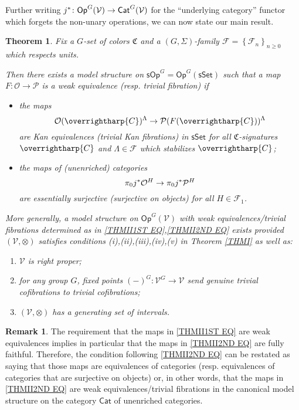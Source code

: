 \documentclass[a4paper,10pt
,draft
]{article}%
\numberwithin{equation}{section}
\numberwithin{figure}{section}
\newtheorem{theorem}[equation]{Theorem}%
\theoremstyle{definition} %
\newtheorem{remark}[equation]{Remark}%
\newcommand{\set}[1]{\left\{#1\right\}}%
\newcommand{\vect}[1]{\text{\overrightharp{\ensuremath{#1}}}}
\newcommand{\Op}{\mathsf{Op}}%
\newcommand{\F}{\ensuremath{\mathcal F}}
\newcommand{\V}{\ensuremath{\mathcal V}}
\renewcommand{\O}{\ensuremath{\mathcal O}}
\newcommand{\1}{\ensuremath{\mathbbm 1}}%
\begin{document}
Further writing 
$j^{\**} \colon 
\mathsf{Op}^G(\V) \to \mathsf{Cat}^G(\V)$
for the ``underlying category''
functor which forgets the non-unary operations, 
we can now state our main result.



\begin{theorem}\label{THMII}
Fix a $G$-set of colors $\mathfrak{C}$
and a $(G,\Sigma)$-family $\F = \set{\F_n}_{n \geq 0}$
which respects units.

Then there exists a model structure on
$\mathsf{sOp}^G = 
\mathsf{Op}^G(\mathsf{sSet})$
such that a map
$F\colon \mathcal{O} \to \mathcal{P}$
is a weak equivalence (resp. trivial fibration) if
\begin{itemize}
\item the maps
\begin{equation}\label{THMII1ST EQ}
	\O(\vect{C})^{\Lambda} \to \mathcal{P}(F(\vect{C}))^{\Lambda}
\end{equation}
are Kan equivalences (trivial Kan fibrations)
in $\mathsf{sSet}$
for all $\mathfrak{C}$-signatures $\vect{C}$
and $\Lambda \in \F$ which stabilizes $\vect{C}$;
\item 
the maps of (unenriched) categories
\begin{equation}\label{THMII2ND EQ}
\pi_0 j^{\**} \O^H 
\to 
\pi_0 j^{\**} \mathcal{P}^H 
\end{equation}
are essentially surjective (surjective on objects)
for all $H \in \F_1$.
\end{itemize}
More generally, a model structure on 
$\Op^G(\V)$
with weak equivalences/trivial fibrations determined as in 
\eqref{THMII1ST EQ},\eqref{THMII2ND EQ}
exists provided $(\V,\otimes)$ satisfies conditions
(i),(ii),(iii),(iv),(v) in Theorem \ref{THMI}
as well as:
\begin{enumerate}
	\item[(vi)] $\V$ is right proper;
	\item[(vii)]
	for any group $G$, fixed points
	$(-)^{G} \colon \V^G \to \V$
	send genuine trivial cofibrations to trivial cofibrations;
	\item[(viii)] $(\V, \otimes)$ has a generating set of intervals.
\end{enumerate}
\end{theorem}





\begin{remark}\label{WETRFCAN REM}
The requirement that the maps in 
\eqref{THMII1ST EQ}
are weak equivalences implies in particular that the maps in
\eqref{THMII2ND EQ}
are fully faithful.
Therefore, the condition following \eqref{THMII2ND EQ}
can be restated as saying that those maps are
equivalences of categories (resp. equivalences of categories that are surjective on objects) or, in other words,
that the maps in \eqref{THMII2ND EQ}
are weak equivalences/trivial fibrations in the canonical model structure on the category $\mathsf{Cat}$ of unenriched categories.
\end{remark}
\end{document}
